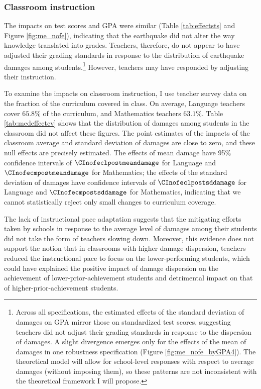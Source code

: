 \subsubsection{Classroom instruction}\label{sec:instruction}



 The impacts on test scores and GPA were similar (Table \ref{tab:effectsts} and Figure \ref{fig:me_nofe}), indicating that the earthquake did not alter the way knowledge translated into grades. Teachers, therefore, do not appear to have adjusted their grading standards in response to the distribution of earthquake damages among students.\footnote{Across all specifications, the estimated effects of the standard deviation of damages on GPA mirror those on standardized test scores, suggesting teachers did not adjust their grading standards in response to the dispersion of damages. A slight divergence emerges only for the effects of the mean of damages in one robustness specification (Figure \ref{fig:me_nofe_byGPA4}). The theoretical model will allow for school-level responses with respect to average damages (without imposing them), so these patterns are not inconsistent with the theoretical framework I will propose.  } However, teachers may have responded by adjusting their instruction.\par

To examine the impacts on classroom instruction, I use teacher survey data on the fraction of the curriculum covered in class. On average, Language teachers cover $65.8\%$ of the curriculum, and Mathematics teachers $63.1\%$. Table \ref{tab:medeffectcv} shows that the distribution of damages among students in the classroom did not affect these figures. The point estimates of the impacts of the classroom average and standard deviation of damages are close to zero, and these null effects are precisely estimated. The effects of mean damage have 95\% confidence intervals of $\CInofeclpostmeandamage$  for Language and $\CInofecmpostmeandamage$ for Mathematics; the effects of the standard deviation of damages have confidence intervals of $\CInofeclpostsddamage$ for Language and $\CInofecmpostsddamage$ for Mathematics, indicating that we cannot statistically reject only small changes to curriculum coverage.\par 
The lack of instructional pace adaptation suggests that the mitigating efforts taken by schools in response to the average level of damages among their students did not take the form of teachers slowing down. Moreover, this evidence does not support the notion that in classrooms with higher damage dispersion, teachers reduced the instructional pace to focus on the lower-performing students, which could have explained the positive impact of damage dispersion on the achievement of lower-prior-achievement students and detrimental impact on that of higher-prior-achievement students.\par 









